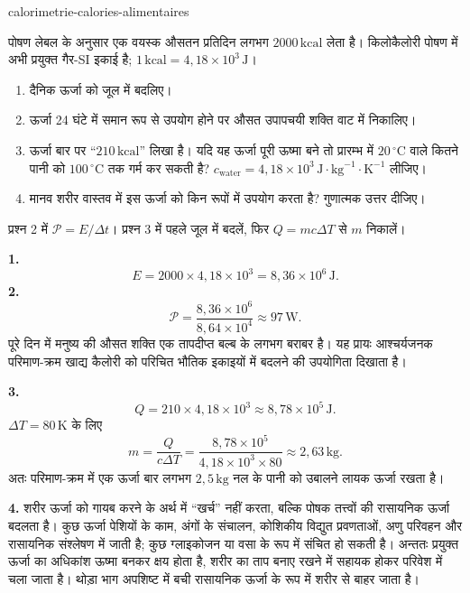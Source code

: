\begin{exo}[खाद्य कैलोरी और उपापचयी शक्ति]{calorimetrie-calories-alimentaires}

पोषण लेबल के अनुसार एक वयस्क औसतन प्रतिदिन लगभग $2000\,\text{kcal}$ लेता है। किलोकैलोरी पोषण में अभी प्रयुक्त गैर-SI इकाई है; $1\,\text{kcal}=4{,}18\times10^3\,\text{J}$।
\begin{enumerate}
  \item दैनिक ऊर्जा को जूल में बदलिए।
  \item ऊर्जा 24 घंटे में समान रूप से उपयोग होने पर औसत उपापचयी शक्ति वाट में निकालिए।
  \item ऊर्जा बार पर ``$210\,\text{kcal}$'' लिखा है। यदि यह ऊर्जा पूरी ऊष्मा बने तो प्रारम्भ में $20\,^\circ\text{C}$ वाले कितने पानी को $100\,^\circ\text{C}$ तक गर्म कर सकती है? $c_{\text{water}}=4{,}18\times10^3\,\text{J}\!\cdot\!\text{kg}^{-1}\!\cdot\!\text{K}^{-1}$ लीजिए।
  \item मानव शरीर वास्तव में इस ऊर्जा को किन रूपों में उपयोग करता है? गुणात्मक उत्तर दीजिए।
\end{enumerate}
\begin{indication}
प्रश्न 2 में $\mathcal P=E/\Delta t$। प्रश्न 3 में पहले जूल में बदलें, फिर $Q=mc\Delta T$ से $m$ निकालें।
\end{indication}
\begin{solution}
\textbf{1.}
\[
E=2000\times4{,}18\times10^3=8{,}36\times10^6\,\text{J}.
\]
\textbf{2.}
\[
\mathcal P=\frac{8{,}36\times10^6}{8{,}64\times10^4}\approx97\,\text{W}.
\]
पूरे दिन में मनुष्य की औसत शक्ति एक तापदीप्त बल्ब के लगभग बराबर है। यह प्रायः आश्चर्यजनक परिमाण-क्रम खाद्य कैलोरी को परिचित भौतिक इकाइयों में बदलने की उपयोगिता दिखाता है।

\textbf{3.}
\[
Q=210\times4{,}18\times10^3\approx8{,}78\times10^5\,\text{J}.
\]
$\Delta T=80\,\text{K}$ के लिए
\[
m=\frac{Q}{c\Delta T}
=\frac{8{,}78\times10^5}{4{,}18\times10^3\times80}
\approx2{,}63\,\text{kg}.
\]
अतः परिमाण-क्रम में एक ऊर्जा बार लगभग $2{,}5\,\text{kg}$ नल के पानी को उबालने लायक ऊर्जा रखता है।

\textbf{4.} शरीर ऊर्जा को गायब करने के अर्थ में ``खर्च'' नहीं करता, बल्कि पोषक तत्त्वों की रासायनिक ऊर्जा बदलता है। कुछ ऊर्जा पेशियों के काम, अंगों के संचालन, कोशिकीय विद्युत प्रवणताओं, अणु परिवहन और रासायनिक संश्लेषण में जाती है; कुछ ग्लाइकोजन या वसा के रूप में संचित हो सकती है। अन्ततः प्रयुक्त ऊर्जा का अधिकांश ऊष्मा बनकर क्षय होता है, शरीर का ताप बनाए रखने में सहायक होकर परिवेश में चला जाता है। थोड़ा भाग अपशिष्ट में बची रासायनिक ऊर्जा के रूप में शरीर से बाहर जाता है।
\end{solution}
\end{exo}
